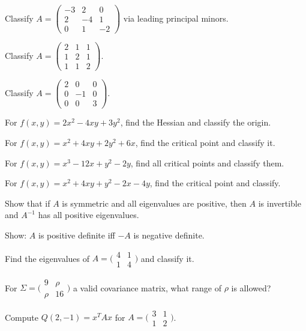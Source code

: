 \begin{problems}
    \item Classify $A = \begin{pmatrix} -3 & 2 & 0 \\ 2 & -4 & 1 \\ 0 & 1 & -2 \end{pmatrix}$ via leading principal minors.
    \item Classify $A = \begin{pmatrix} 2 & 1 & 1 \\ 1 & 2 & 1 \\ 1 & 1 & 2 \end{pmatrix}$.
    \item Classify $A = \begin{pmatrix} 2 & 0 & 0 \\ 0 & -1 & 0 \\ 0 & 0 & 3 \end{pmatrix}$.
    \item For $f(x, y) = 2 x^{2} - 4 x y + 3 y^{2}$, find the Hessian and classify the origin.
    \item For $f(x, y) = x^{2} + 4 x y + 2 y^{2} + 6 x$, find the critical point and classify it.
    \item For $f(x, y) = x^{3} - 12 x + y^{2} - 2 y$, find all critical points and classify them.
    \item For $f(x, y) = x^{2} + 4 x y + y^{2} - 2 x - 4 y$, find the critical point and classify.
    \item Show that if $A$ is symmetric and all eigenvalues are positive, then $A$ is invertible and $A^{-1}$ has all positive eigenvalues.
    \item Show: $A$ is positive definite iff $-A$ is negative definite.
    \item Find the eigenvalues of $A = \bigl(\begin{smallmatrix} 4 & 1 \\ 1 & 4 \end{smallmatrix}\bigr)$ and classify it.
    \item For $\Sigma = \bigl(\begin{smallmatrix} 9 & \rho \\ \rho & 16 \end{smallmatrix}\bigr)$ a valid covariance matrix, what range of $\rho$ is allowed?
    \item Compute $Q(2, -1) = x^{T} A x$ for $A = \bigl(\begin{smallmatrix} 3 & 1 \\ 1 & 2 \end{smallmatrix}\bigr)$.

\end{problems}
